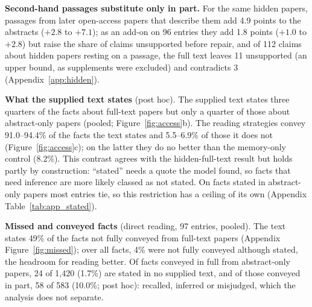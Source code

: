 \documentclass{article} %
\begin{document}
\textbf{Second-hand passages substitute only in part.} For the same hidden papers, passages from later open-access papers that describe them add 4.9 points to the abstracts ($+2.8$ to $+7.1$); as an add-on on 96 entries they add 1.8 points ($+1.0$ to $+2.8$) but raise the share of claims unsupported before repair, and of 112 claims about hidden papers resting on a passage, the full text leaves 11 unsupported (an upper bound, as supplements were excluded) and contradicts 3 (Appendix~\ref{app:hidden}).

\textbf{What the supplied text states} (post hoc). The supplied text states three quarters of the facts about full-text papers but only a quarter of those about abstract-only papers (pooled; Figure~\ref{fig:access}b). The reading strategies convey 91.0--94.4\% of the facts the text states and 5.5--6.9\% of those it does not (Figure~\ref{fig:access}c); on the latter they do no better than the memory-only control (8.2\%). This contrast agrees with the hidden-full-text result but holds partly by construction: ``stated'' needs a quote the model found, so facts that need inference are more likely classed as not stated. On facts stated in abstract-only papers most entries tie, so this restriction has a ceiling of its own (Appendix Table~\ref{tab:app_stated}).

\textbf{Missed and conveyed facts} (direct reading, 97 entries, pooled). The text states 49\% of the facts not fully conveyed from full-text papers (Appendix Figure~\ref{fig:missed}); over all facts, 4\% were not fully conveyed although stated, the headroom for reading better. Of facts conveyed in full from abstract-only papers, 24 of 1,420 (1.7\%) are stated in no supplied text, and of those conveyed in part, 58 of 583 (10.0\%; post hoc): recalled, inferred or misjudged, which the analysis does not separate.
\end{document}

